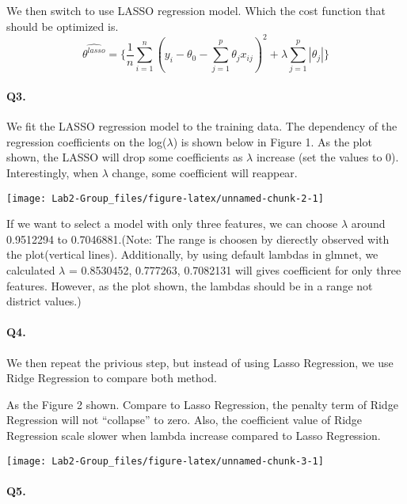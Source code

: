 \documentclass[
]{article}
\begin{document}
We then switch to use LASSO regression model. Which the cost function
that should be optimized is.
\[\hat{\theta^{lasso}} = \{\frac{1}{n}\sum_{i = 1}^{n}(y_i-\theta_0-\sum_{j = 1}^{p}\theta_jx_{ij})^2 + \lambda\sum_{j = 1}^{p}|\theta_j| \}\]

\hypertarget{q3.}{%
\paragraph{Q3.}\label{q3.}}

We fit the LASSO regression model to the training data. The dependency
of the regression coefficients on the log(\(\lambda\)) is shown below in
Figure 1. As the plot shown, the LASSO will drop some coefficients as
\(\lambda\) increase (set the values to 0). Interestingly, when
\(\lambda\) change, some coefficient will reappear.

\begin{center}\texttt{[image: Lab2-Group\_files/figure-latex/unnamed-chunk-2-1]} \end{center}

If we want to select a model with only three features, we can choose
\(\lambda\) around 0.9512294 to 0.7046881.(Note: The range is choosen by
dierectly observed with the plot(vertical lines). Additionally, by using
default lambdas in glmnet, we calculated \(\lambda\) = 0.8530452,
0.777263, 0.7082131 will gives coefficient for only three features.
However, as the plot shown, the lambdas should be in a range not
district values.)

\hypertarget{q4.}{%
\paragraph{Q4.}\label{q4.}}

We then repeat the privious step, but instead of using Lasso Regression,
we use Ridge Regression to compare both method.

As the Figure 2 shown. Compare to Lasso Regression, the penalty term of
Ridge Regression will not ``collapse'' to zero. Also, the coefficient
value of Ridge Regression scale slower when lambda increase compared to
Lasso Regression.

\begin{center}\texttt{[image: Lab2-Group\_files/figure-latex/unnamed-chunk-3-1]} \end{center}

\hypertarget{q5.}{%
\paragraph{Q5.}\label{q5.}}
\end{document}

